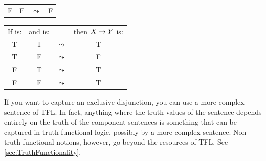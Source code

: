 \begin{highlighted}
\begin{center}
\begin{tabular}{cccc}
				F & F &$\leadsto$& F
			\end{tabular}
		\end{center}
		\begin{center}
			\begin{tabular}{cccc}
				If \metaX is:&and \metaY is:&&then $X\rightarrow Y$ is:\\
				T & T &$\leadsto$& T\\
				T & F &$\leadsto$& F\\
				F & T &$\leadsto$& T\\
				F & F &$\leadsto$& T
			\end{tabular}
		\end{center}
\end{highlighted}



If you want to capture an exclusive disjunction, you can use a more complex sentence of TFL. In fact, anything where the truth values of the sentence depends entirely on the truth of the component sentences is something that can be captured in truth-functional logic, possibly by a more complex sentence. Non-truth-functional notions, however, go beyond the resources of TFL. See \cref{sec:TruthFunctionality}.





